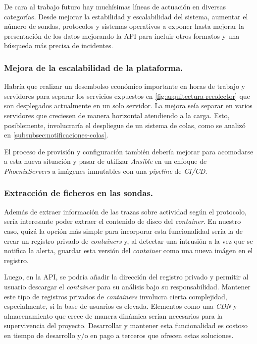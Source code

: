 De cara al trabajo futuro hay muchísimas líneas de actuación en diversas categorías. Desde mejorar la estabilidad 
y escalabilidad del sistema, aumentar el número de sondas, protocolos y sistemas operativos a exponer hasta 
mejorar la presentación de los datos mejorando la API para incluir otros formatos y una búsqueda más precisa de incidentes.

\subsubsection{Mejora de la escalabilidad de la plataforma.}

Habría que realizar un desembolso económico importante en horas de trabajo y servidores para separar los servicios expuestos
en \ref{fig:arquitectura-recolector} que son desplegados actualmente en un solo servidor. La mejora seía separar en varios servidores que creciesen
de manera horizontal atendiendo a la carga. Esto, posiblemente, involucraría el despliegue de un sistema de colas, como se analizó
en \ref{subsubsec:notificaciones-colas}.

El proceso de provisión y configuración también debería mejorar para acomodarse a esta nueva situación y pasar de utilizar \emph{Ansible}
en un enfoque de \emph{PhoenixServers} a imágenes inmutables con una \emph{pipeline} de \emph{CI/CD}.

\subsubsection{Extracción de ficheros en las sondas.}

Además de extraer información de las trazas sobre actividad según el protocolo, sería interesante poder extraer el contenido de disco del \emph{container}.
En nuestro caso, quizá la opción más simple para incorporar esta funcionalidad sería la de crear un registro privado de \emph{containers} y, al detectar 
una intrusión a la vez que se notifica la alerta, guardar esta versión del \emph{container} como una nueva imágen en el registro.

Luego, en la API, se podría añadir la dirección del registro privado y permitir al usuario descargar el \emph{container} para su análisis bajo su responsabilidad. 
Mantener este tipo de registros privados de \emph{containers} involucra cierta complejidad, especialmente, si la base de usuarios es elevada. Elementos como
una \emph{CDN} y almacenamiento que crece de manera dinámica serían necesarios para la supervivencia del proyecto. Desarrollar y mantener esta funcionalidad
es costoso en tiempo de desarrollo y/o en pago a terceros que ofrecen estas soluciones.

